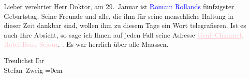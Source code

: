 \pstart
           \noindent{}{\pb}Lieber verehrter Herr
                  Doktor, am 29. Januar ist \textcolor{blue}{Romain Rollands}{}\ledrightnote{\textcolor{blue}{Romain Rolland}} fünfzigster Geburtstag. Seine Freunde und
               alle, die ihm für seine menschliche Haltung in dieser Zeit dankbar sind, wollen ihm
               zu diesem Tage ein Wort telegrafieren. Ist es auch Ihre Absicht, so sage ich Ihnen
               auf jeden Fall seine Adresse \textcolor{pink}{\uline{Genf–Champel}, Hotel Beau Sejour}{}\ledrightnote{\textcolor{pink}{Hôtel Beau-Séjour}}. \label{K_L03652-2v}\label{K_L03652-2h}. Es war herrlich über alle
               Maassen.\pend
           
\pstart
           Treulichst Ihr{\\[\baselineskip]}\spacefill\mbox{Stefan Zweig}\pend
           \leftskip=0em{}\endnumbering{}
\begin{anhang}
\end{anhang}
      